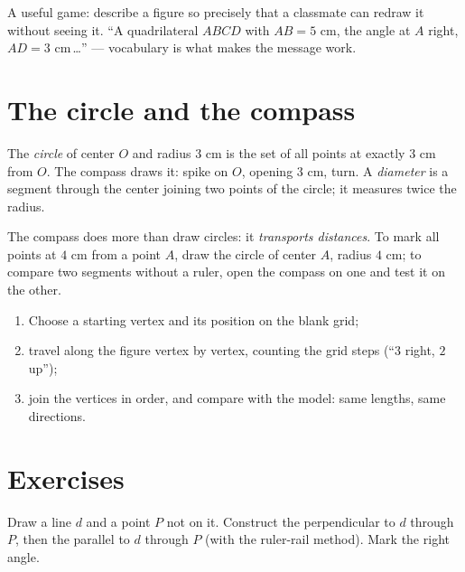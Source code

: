 \begin{example}\label{ex:g4:geometry:describe}
A useful game: describe a figure so precisely that a classmate can
redraw it without seeing it. ``A quadrilateral $ABCD$ with
$AB = 5$ cm, the angle at $A$ right, $AD = 3$ cm\,\dots'' ---
vocabulary is what makes the message work.
\end{example}

\section{The circle and the compass}

\begin{definition}[Circle]\label{def:g4:geometry:circle}
The \emph{circle} of center $O$ and radius $3$ cm is the set of all
points at exactly $3$ cm from $O$. The compass draws it: spike on
$O$, opening $3$ cm, turn. A \emph{diameter} is a segment through
the center joining two points of the circle; it measures twice the
radius.
\end{definition}

\begin{example}\label{ex:g4:geometry:compass}
The compass does more than draw circles: it \emph{transports
distances}. To mark all points at $4$ cm from a point $A$, draw the
circle of center $A$, radius $4$ cm; to compare two segments without
a ruler, open the compass on one and test it on the other.
\end{example}

\begin{method}\label{met:g4:geometry:reproduce}
\begin{enumerate}
  \item Choose a starting vertex and its position on the blank grid;
  \item travel along the figure vertex by vertex, counting the grid
        steps (``$3$ right, $2$ up'');
  \item join the vertices in order, and compare with the model:
        same lengths, same directions.
\end{enumerate}
\end{method}

\section{Exercises}

\begin{exercise}[$\star$]\label{exo:g4:geometry:1}
Draw a line $d$ and a point $P$ not on it. Construct the
perpendicular to $d$ through $P$, then the parallel to $d$ through
$P$ (with the ruler-rail method). Mark the right angle.
\end{exercise}

